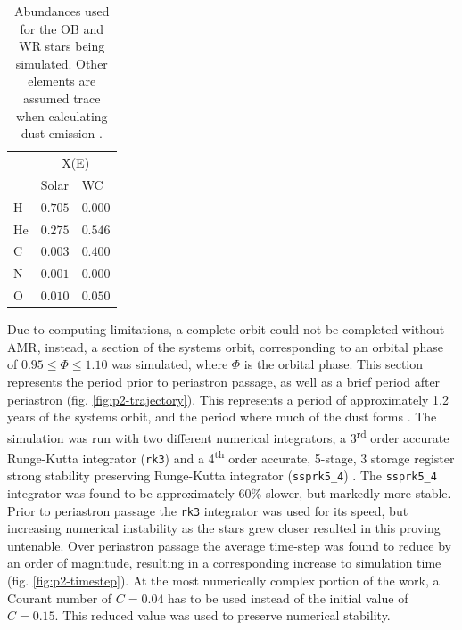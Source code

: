 \documentclass[fleqn,usenatbib]{mnras}
\newcommand{\ts}{\textsuperscript}
\begin{document}
\begin{table}
  \centering
  \begin{tabular}{@{}lll@{}}
  \toprule
  \multicolumn{1}{l}{} & \multicolumn{2}{c}{X(E)} \\ \cmidrule(l){2-3} 
   & Solar & WC \\ \midrule
  H & $0.705$ & $0.000$ \\
  He & $0.275$ & $0.546$ \\
  C & $0.003$ & $0.400$ \\
  N & $0.001$ & $0.000$ \\
  O & $0.010$ & $0.050$ \\
  \hline
  \end{tabular}
  \caption[Abundances by mass used for OB and WR stars]{Abundances used for the OB and WR stars being simulated. Other elements are assumed trace when calculating dust emission \citep{williamsSpectraWC9Stars2015}.}
  \label{tab:p2-abundances}
\end{table}

Due to computing limitations, a complete orbit could not be completed without AMR, instead, a section of the systems orbit, corresponding to an orbital phase of $0.95 \leq \Phi \leq 1.10$ was simulated, where $\Phi$ is the orbital phase.
This section represents the period prior to periastron passage, as well as a brief period after periastron
(fig. \ref{fig:p2-trajectory}).
This represents a period of approximately \num{1.2} years of the systems orbit, and the period where much of the dust forms \citep{crowther_dust_2003}.
The simulation was run with two different numerical integrators, a 3\ts{rd} order accurate Runge-Kutta integrator (\texttt{rk3}) and a 4\ts{th} order accurate, 5-stage, 3 storage register strong stability preserving Runge-Kutta integrator (\texttt{ssprk5\_4})
\citep{ruuthHighOrderStrongStabilityPreservingRungeKutta2005}.
The \texttt{ssprk5\_4} integrator was found to be approximately 60\% slower, but markedly more stable.
Prior to periastron passage the \texttt{rk3} integrator was used for its speed, but increasing numerical instability as the stars grew closer resulted in this proving untenable.
Over periastron passage the average time-step was found to reduce by an order of magnitude, resulting in a corresponding increase to simulation time (fig. \ref{fig:p2-timestep}).
At the most numerically complex portion of the work, a Courant number of $C = 0.04$ has to be used instead of the initial value of $C = 0.15$.
This reduced value was used to preserve numerical stability.
\end{document}
